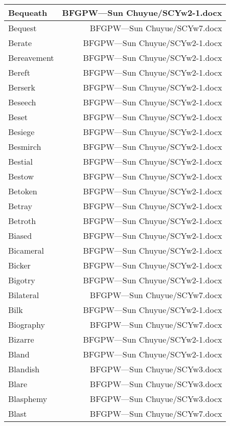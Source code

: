 \documentclass{article}
\begin{document}
\begin{center}
\begin{longtable}{|l|r|}
\hline
Bequeath  &  BFGPW---Sun Chuyue/SCYw2-1.docx\\  
\hline
Bequest  &  BFGPW---Sun Chuyue/SCYw7.docx\\  
\hline
Berate  &  BFGPW---Sun Chuyue/SCYw2-1.docx\\  
\hline
Bereavement  &  BFGPW---Sun Chuyue/SCYw2-1.docx\\  
\hline
Bereft  &  BFGPW---Sun Chuyue/SCYw2-1.docx\\  
\hline
Berserk  &  BFGPW---Sun Chuyue/SCYw2-1.docx\\  
\hline
Beseech  &  BFGPW---Sun Chuyue/SCYw2-1.docx\\  
\hline
Beset  &  BFGPW---Sun Chuyue/SCYw2-1.docx\\  
\hline
Besiege  &  BFGPW---Sun Chuyue/SCYw2-1.docx\\  
\hline
Besmirch  &  BFGPW---Sun Chuyue/SCYw2-1.docx\\  
\hline
Bestial  &  BFGPW---Sun Chuyue/SCYw2-1.docx\\  
\hline
Bestow  &  BFGPW---Sun Chuyue/SCYw2-1.docx\\  
\hline
Betoken  &  BFGPW---Sun Chuyue/SCYw2-1.docx\\  
\hline
Betray  &  BFGPW---Sun Chuyue/SCYw2-1.docx\\  
\hline
Betroth  &  BFGPW---Sun Chuyue/SCYw2-1.docx\\  
\hline
Biased  &  BFGPW---Sun Chuyue/SCYw2-1.docx\\  
\hline
Bicameral  &  BFGPW---Sun Chuyue/SCYw2-1.docx\\  
\hline
Bicker  &  BFGPW---Sun Chuyue/SCYw2-1.docx\\  
\hline
Bigotry  &  BFGPW---Sun Chuyue/SCYw2-1.docx\\  
\hline
Bilateral  &  BFGPW---Sun Chuyue/SCYw7.docx\\  
\hline
Bilk  &  BFGPW---Sun Chuyue/SCYw2-1.docx\\  
\hline
Biography  &  BFGPW---Sun Chuyue/SCYw7.docx\\  
\hline
Bizarre  &  BFGPW---Sun Chuyue/SCYw2-1.docx\\  
\hline
Bland  &  BFGPW---Sun Chuyue/SCYw2-1.docx\\  
\hline
Blandish  &  BFGPW---Sun Chuyue/SCYw3.docx\\  
\hline
Blare  &  BFGPW---Sun Chuyue/SCYw3.docx\\  
\hline
Blasphemy  &  BFGPW---Sun Chuyue/SCYw3.docx\\  
\hline
Blast  &  BFGPW---Sun Chuyue/SCYw7.docx\\  

\end{longtable}
\end{center}
\end{document}
